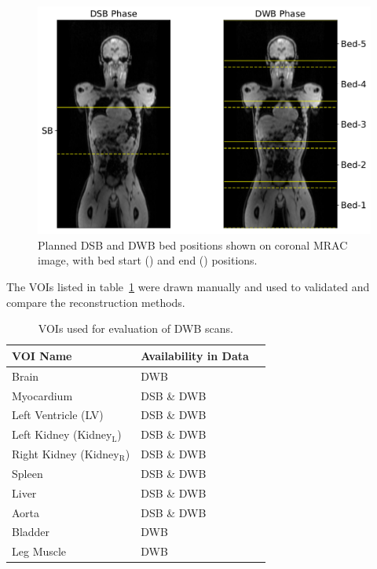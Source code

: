\begin{figure} [h!]
\centering
\includegraphics[scale=0.42,angle=0]{3_Results/3_3_DWB_Reconstruction/figures/3_3_IsotoPK_CTRL_PositionsOnMR.pdf}
\caption{Planned DSB and DWB bed positions shown on coronal MRAC image, with bed start (\protect{}) and end (\protect{}) positions.} 
\label{fig_3_3:IsotoPK_BedPositionsOnMR}
\end{figure} 

The VOIs listed in table~\ref{tab:IsotoPK_VOIs} were drawn manually and used to validated and compare the reconstruction methods.

\begin{table}[h!]
\centering
\caption{\label{tab:IsotoPK_VOIs} VOIs used for evaluation of DWB scans.}
\begin{tabular}{lll}
\toprule
\textbf{VOI Name} & \textbf{Availability in Data}  \\
\midrule
Brain        & DWB                 \\
Myocardium & DSB \& DWB              \\
Left Ventricle (LV) & DSB \& DWB     \\
Left Kidney (Kidney$_\mathrm{L}$) & DSB \& DWB  \\
Right Kidney (Kidney$_\mathrm{R}$) & DSB \& DWB \\
Spleen & DSB \& DWB \\
Liver  & DSB \& DWB \\
Aorta & DSB \& DWB \\
Bladder & DWB \\
Leg Muscle & DWB \\
\toprule
\end{tabular}
\end{table}

